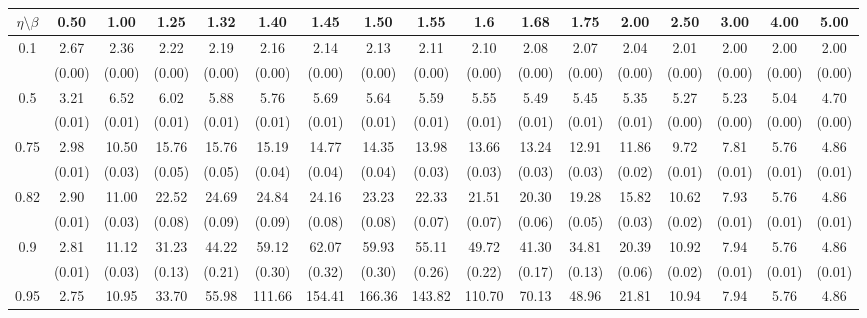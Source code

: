 \documentclass[12pt]{article}  %
\theoremstyle{plain}
\begin{document}
\begin{sidewaystable}[htbp]
\centering
{}
\label{ATS_10-1}
\ \\
\begin{tabular}{ccccccccccccccccc}
\hline
$\eta \setminus \beta $        & 0.50   & 1.00   & 1.25   & 1.32   & 1.40   & 1.45   & 1.50   & 1.55   & 1.6   & 1.68   & 1.75   & 2.00   & 2.50   & 3.00   & 4.00  &5.00 \\ \hline
\multirow{2}{*}{0.1}  & 2.67 & 2.36 & 2.22 & 2.19 &  2.16 &  2.14  & 2.13  & 2.11  & 2.10 & 2.08 & 2.07 & 2.04 & 2.01 & 2.00 & 2.00 & 2.00  \\
                      & (0.00) & (0.00) & (0.00) & (0.00) & (0.00) & (0.00) & (0.00) & (0.00) & (0.00) & (0.00) & (0.00) & (0.00) & (0.00) & (0.00) & (0.00) & (0.00)\\ \hline
\multirow{2}{*}{0.5}  & 3.21 & 6.52&  6.02 & 5.88 &  5.76 &  5.69&   5.64 &  5.59  & 5.55 & 5.49 & 5.45 & 5.35 & 5.27 &5.23 & 5.04 & 4.70 \\
                      & (0.01) & (0.01) & (0.01) & (0.01) & (0.01) & (0.01) & (0.01) & (0.01) & (0.01) & (0.01) & (0.01) & (0.01)  & (0.00) & (0.00) & (0.00)&(0.00)\\ \hline
\multirow{2}{*}{0.75}  & 2.98 &10.50& 15.76& 15.76 & 15.19 & 14.77 & 14.35 & 13.98 & 13.66 &13.24& 12.91& 11.86 & 9.72&7.81 & 5.76 & 4.86\\
                      & (0.01)& (0.03)& (0.05) &(0.05) &(0.04)& (0.04)& (0.04)& (0.03)& (0.03)&  (0.03)&  (0.03)&  (0.02)&  (0.01)&  (0.01)&  (0.01)& (0.01)\\ \hline
\multirow{2}{*}{0.82}  & 2.90 &11.00& 22.52 &24.69  &24.84 & 24.16 & 23.23 & 22.33 & 21.51 &20.30& 19.28& 15.82& 10.62& 7.93 & 5.76&  4.86\\
                      & (0.01)& (0.03)& (0.08)& (0.09)& (0.09)& (0.08)& (0.08)& (0.07)& (0.07)&  (0.06)&  (0.05)&  (0.03)&  (0.02)&  (0.01)&  (0.01)&(0.01)\\ \hline
\multirow{2}{*}{0.9}  & 2.81 &11.12& 31.23& 44.22 & 59.12&  62.07 & 59.93 & 55.11 & 49.72& 41.30 &34.81& 20.39 &10.92& 7.94 & 5.76 & 4.86\\
                      & (0.01)& (0.03)& (0.13)& (0.21)& (0.30)& (0.32)& (0.30)& (0.26)& (0.22)&  (0.17)&  (0.13)&  (0.06)&  (0.02)&  (0.01)&  (0.01)&(0.01)\\ \hline                                               
\multirow{2}{*}{0.95}  & 2.75 &10.95& 33.70& 55.98 &111.66& 154.41 &166.36 &143.82 &110.70 &70.13 &48.96 &21.81& 10.94& 7.94 & 5.76 & 4.86\\

\end{tabular}
\end{sidewaystable}
\end{document}
